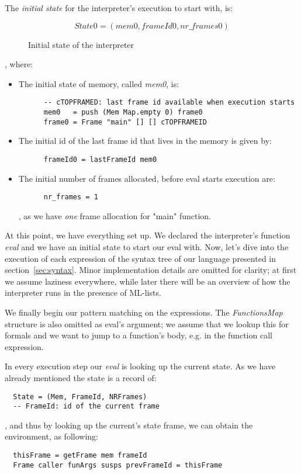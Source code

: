 \documentclass[diploma]{softlab-thesis}
\begin{document}
The \textit{initial state} for the interpreter's execution to start with, is:
\begin{figure}[h]
\[ 
  \mathit{State0 = (mem0, frameId0, nr\_frames0) }
\]
\caption{Initial state of the interpreter\label{fig:state0}}
\end{figure}
, where:
\begin{itemize}
  \item The initial state of memory, called \textit{mem0}, is:
    \begin{verbatim}
      -- cTOPFRAMED: last frame id available when execution starts
      mem0   = push (Mem Map.empty 0) frame0 
      frame0 = Frame "main" [] [] cTOPFRAMEID 
    \end{verbatim}
  \item The initial id of the last frame id that lives in the memory is given by:
    \begin{verbatim}
      frameId0 = lastFrameId mem0
    \end{verbatim}
  \item The initial number of frames allocated, before eval starts execution are:
    \begin{verbatim}
      nr_frames = 1
    \end{verbatim}
  , as we have \textit{one} frame allocation for "main" function.
\end{itemize}

At this point, we have everything set up. We declared the interpreter's function \textit{eval} and we have an initial 
state to start our eval with. Now, let's dive into the execution of each expression of the syntax tree of our language 
presented in section~\ref{sec:syntax}. Minor implementation details are omitted for clarity; at first we assume laziness everywhere, 
while later there will be an overview of how the interpreter runs in the presence of ML-lists.
\newline
\par We finally begin our pattern matching on the expressions. The \textit{FunctionsMap} structure is also omitted as 
eval's argument; we assume that we lookup this for formals and we want to jump to a function's body, e.g. in the function  
call expression.

In every execution step our \textit{eval} is looking up the current state. As we have already mentioned the state is 
a record of:
\begin{verbatim}
  State = (Mem, FrameId, NRFrames) 
  -- FrameId: id of the current frame
\end{verbatim}
, and thus by looking up the current's state frame, we can obtain the environment, as following:
\begin{verbatim}
  thisFrame = getFrame mem frameId 
  Frame caller funArgs susps prevFrameId = thisFrame 
\end{verbatim}
\end{document}
